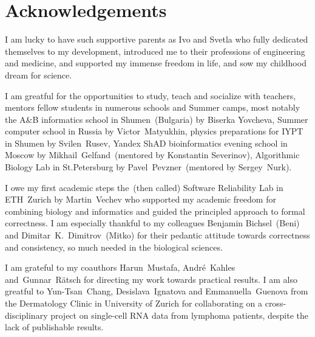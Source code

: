 
\bigskip

\begingroup
\let\clearpage\relax
\let\cleardoublepage\relax
\let\cleardoublepage\relax
\chapter*{Acknowledgements}

\def\thanks#1{%
\begingroup
\leftskip1em
\noindent #1
\par
\endgroup
}

I am lucky to have such supportive parents as Ivo and Svetla who fully dedicated
themselves to my development, introduced me to their professions of engineering
and medicine, and supported my immense freedom in life, and sow my childhood
dream for science.

I am greatful for the opportunities to study, teach and socialize with teachers,
mentors fellow students in numerous schools and Summer camps, most notably the
A\&B informatics school in Shumen~(Bulgaria) by Biserka Yovcheva, Summer
computer school in Russia by Victor~Matyukhin, physics preparations for IYPT in
Shumen by Svilen~Rusev, Yandex ShAD bioinformatics evening school in Moscow by
Mikhail~Gelfand~(mentored by Konstantin Severinov), Algorithmic Biology Lab in
St.Petersburg by Pavel~Pevzner~(mentored by Sergey~Nurk).

I owe my first academic steps the~(then called) Software Reliability Lab in
ETH~Zurich by Martin~Vechev who supported my academic freedom for combining
biology and informatics and guided the principled approach to formal
correctness. I am especially thankful to my colleagues Benjamin Bichsel~(Beni)
and Dimitar~K.~Dimitrov~(Mitko) for their pedantic attitude towards correctness
and consistency, so much needed in the biological sciences.

I am grateful to my coauthors Harun~Mustafa, André~Kahles and Gunnar~Rätsch for
directing my \A work towards practical results. I am also greatful to
Yun-Tsan~Chang, Desislava~Ignatova and Emmanuella~Guenova from the Dermatology
Clinic in University of Zurich for collaborating on a cross-disciplinary project
on single-cell RNA data from lymphoma patients, despite the lack of publishable
results.

